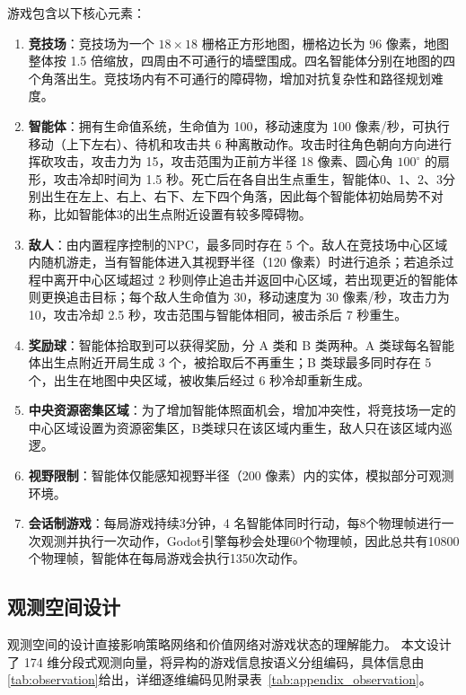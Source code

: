 \documentclass[12pt, a4paper, UTF8]{ctexart}
\numberwithin{equation}{section}
\begin{document}
游戏包含以下核心元素：
\begin{enumerate}[label=(\arabic*)]
  \item \textbf{竞技场}：竞技场为一个 $18\times18$ 栅格正方形地图，栅格边长为 96 像素，地图整体按 1.5 倍缩放，四周由不可通行的墙壁围成。四名智能体分别在地图的四个角落出生。竞技场内有不可通行的障碍物，增加对抗复杂性和路径规划难度。
  \item \textbf{智能体}：拥有生命值系统，生命值为 100，移动速度为 100 像素/秒，可执行移动（上下左右）、待机和攻击共 6 种离散动作。攻击时往角色朝向方向进行挥砍攻击，攻击力为 15，攻击范围为正前方半径 18 像素、圆心角 $100^\circ$ 的扇形，攻击冷却时间为 1.5 秒。死亡后在各自出生点重生，智能体0、1、2、3分别出生在左上、右上、右下、左下四个角落，因此每个智能体初始局势不对称，比如智能体3的出生点附近设置有较多障碍物。
  \item \textbf{敌人}：由内置程序控制的NPC，最多同时存在 5 个。敌人在竞技场中心区域内随机游走，当有智能体进入其视野半径（120 像素）时进行追杀；若追杀过程中离开中心区域超过 2 秒则停止追击并返回中心区域，若出现更近的智能体则更换追击目标；每个敌人生命值为 30，移动速度为 30 像素/秒，攻击力为 10，攻击冷却 2.5 秒，攻击范围与智能体相同，被击杀后 7 秒重生。
  \item \textbf{奖励球}：智能体拾取到可以获得奖励，分 A 类和 B 类两种。A 类球每名智能体出生点附近开局生成 3 个，被拾取后不再重生；B 类球最多同时存在 5 个，出生在地图中央区域，被收集后经过 6 秒冷却重新生成。
  \item \textbf{中央资源密集区域}：为了增加智能体照面机会，增加冲突性，将竞技场一定的中心区域设置为资源密集区，B类球只在该区域内重生，敌人只在该区域内巡逻。
  \item \textbf{视野限制}：智能体仅能感知视野半径（200 像素）内的实体，模拟部分可观测环境。
  \item \textbf{会话制游戏}：每局游戏持续3分钟，4 名智能体同时行动，每8个物理帧进行一次观测并执行一次动作，Godot引擎每秒会处理60个物理帧，因此总共有10800个物理帧，智能体在每局游戏会执行1350次动作。
\end{enumerate}

\subsection{观测空间设计}
观测空间的设计直接影响策略网络和价值网络对游戏状态的理解能力。
本文设计了 174 维分段式观测向量，将异构的游戏信息按语义分组编码，具体信息由\autoref{tab:observation}给出，详细逐维编码见附录表~\ref{tab:appendix_observation}。
\end{document}
